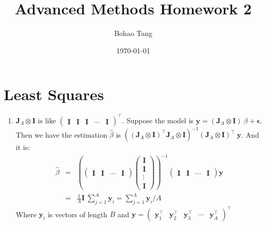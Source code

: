 \documentclass[12pt]{article}
\title{Advanced Methods Homework 2}
\date{\today}
\author{Bohao Tang}
\newcommand{\ttt}[1]{\textbf{#1}}
\begin{document}


\maketitle

\section{Least Squares}
\begin{enumerate}
    \item
    $\ttt{J}_A \otimes \ttt{I}$ is like 
    $\begin{pmatrix}
        \ttt{I} & \ttt{I} & \ttt{I} & \cdots & \ttt{I}
    \end{pmatrix}^\top$.
    Suppose the model is $\ttt{y} = (\ttt{J}_A \otimes \ttt{I})\ \beta + \bm{\epsilon}$. 
    Then we have the estimation $\hat{\beta}$ is $((\ttt{J}_A\otimes\ttt{I})^\top \ttt{J}_A \otimes \ttt{I})^{-1} (\ttt{J}_A \otimes \ttt{I})^\top \ \ttt{y}$. And it is:
    \begin{eqnarray}
        \hat{\beta} &=& \left( \begin{pmatrix} \ttt{I} & \ttt{I} & \cdots & \ttt{I} \end{pmatrix} \begin{pmatrix} \ttt{I} \\ \ttt{I} \\ \vdots \\ \ttt{I} \end{pmatrix} \right)^{-1} \begin{pmatrix} \ttt{I} & \ttt{I} & \cdots & \ttt{I} \end{pmatrix} \ttt{y} \\
                    &=& \frac{1}{A} \ttt{I}\ \sum_{j=1}^{A} \ttt{y}_i = \sum_{j=1}^{A} \ttt{y}_i / A
    \end{eqnarray}
    Where $\ttt{y}_i$ is vectors of length $B$ and $\ttt{y} = \begin{pmatrix}
                                                                    \ttt{y}_1^\top & \ttt{y}_2^\top & \ttt{y}_3^\top & \cdots & \ttt{y}_A^\top
                                                              \end{pmatrix}^\top$
    

\end{enumerate}
\end{document}
